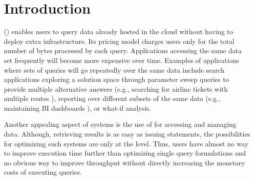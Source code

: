 \section{Introduction}




\Qaasl (\qaas) enables users to query data already
hosted in the cloud without having to deploy extra infrastructure. Its pricing
model charges users only for the total number of bytes
processed by each query.  Applications accessing the same data set frequently
will become more expensive over time.  Examples of applications where sets
of queries will go repeatedly over the same data include search applications exploring a
solution space through parameter sweep queries to provide multiple alternative
answers (e.g., searching for airline tickets with multiple routes
\cite{Unterbrunner:2009:PPU:1687627.1687707}), reporting over different subsets
of the same data (e.g., maintaining BI dashboards
\cite{Wu:2014:CDV:2732951.2732964}), or what-if analysis.

Another appealing aspect of \qaas systems is the use of \sql for accessing and
managing data. Although, retrieving results is as easy as issuing \sql
statements, the possibilities for optimizing such systems are only at the \sql
level. Thus, users have almost no way to improve execution time further than
optimizing single query formulations and no obvious way to improve throughput
without directly increasing the monetary costs of executing queries.

